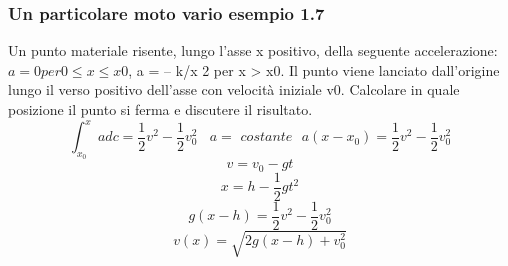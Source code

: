 \documentclass[../../main.tex]{subfiles}
\begin{document}
\subsubsection{Un particolare moto vario esempio 1.7}
Un punto materiale risente, lungo l’asse x positivo, della seguente accelerazione: $a = 0 per 0 \leq x \leq x0$, a = –
k/x 2 per x > x0. Il punto viene lanciato dall’origine lungo il verso positivo dell’asse con velocità iniziale v0. Calcolare
in quale posizione il punto si ferma e discutere il risultato.
\[
    \int_{x_0}^{x} adc = \frac{1}{2}v^2 - \frac{1}{2}v_0^2 \ \ \ \ a =\textit{ costante} \ \ \ a(x-x_0) = \frac{1}{2}v^2 - \frac{1}{2}v_0^2
\]
\[
    v = v_0 - gt
\]
\[
    x = h - \frac{1}{2}gt^2
\]
\[
    g(x-h) = \frac{1}{2}v^2 - \frac{1}{2}v_0^2
\]
\[
    v(x) = \sqrt{2g(x-h) + v_0^2}
\]
\end{document}
